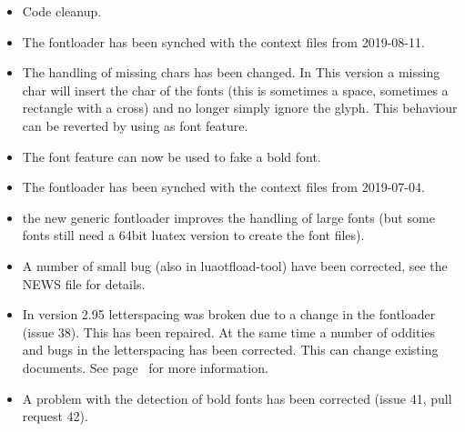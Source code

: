 \begin{itemize}
\item Code cleanup.
\item The fontloader has been synched with the context files from 2019-08-11.
\end{itemize}
\endsubsection
{}
\begin{itemize}
\item The handling of missing chars has been changed. In This version a missing char will insert the  char of the fonts (this is sometimes a space, sometimes a rectangle with a cross) and no longer simply ignore the glyph. This behaviour can be reverted by using  as font feature.
\item The font feature  can now be used to fake a bold font.
\item The fontloader has been synched with the context files from 2019-07-04.
\end{itemize}
\endsubsection
{}
\begin{itemize}
\item the new generic fontloader improves the handling of large fonts (but some fonts still need a 64bit luatex version to create the font files).
\item A number of small bug (also in luaotfload-tool) have been corrected, see the NEWS file for details.

\end{itemize}
\endsubsection

\begin{itemize}
\item In
version 2.95 letterspacing was broken due to a change in the fontloader (issue 38). This has been repaired. At the same time a number of oddities and bugs in the letterspacing has been corrected. This can change existing documents. See page~\pageref{p:letterspace} for more information.

\item A problem with the detection of bold fonts has been corrected (issue 41, pull request 42).

\end{itemize}
\endsubsection



